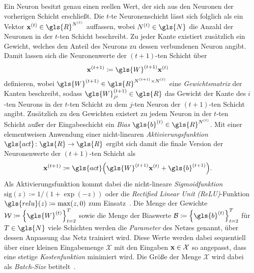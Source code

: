 Ein Neuron besitzt genau einen reellen Wert, der sich aus den Neuronen der vorherigen Schicht erschließt.
Die $t$-te Neuronenschicht lässt sich folglich als ein Vektor $\ve{x}^{\left(t\right)} \in \gls{R}^{N^{\left(t\right)}}$ auffassen, wobei $N^{\left(t\right)} \in \gls{N}$ die Anzahl der Neuronen in der $t$-ten Schicht beschreibt.
Zu jeder Kante existiert zusätzlich ein Gewicht, welches den Anteil des Neurons zu dessen verbundenen Neuron angibt.
Damit lassen sich die Neuronenwerte der $\left(t+1\right)$-ten Schicht über
\begin{equation*}
  \ve{x}^{\left(t+1\right)} \coloneqq \gls{W}^{\left(t+1\right)}\ve{x}^{\left(t\right)}
\end{equation*}
definieren, wobei $\gls{W}^{\left(t+1\right)} \in \gls{R}^{N^{\left(t+1\right)} \times N^{\left(t\right)}}$ eine \emph{Gewichtsmatrix} der Kanten beschreibt, sodass $\gls{W}^{\left(t+1\right)}_{ji} \in \gls{R}$ das Gewicht der Kante des $i$-ten Neurons in der $t$-ten Schicht zu dem $j$-ten Neuron der $\left(t+1\right)$-ten Schicht angibt.
Zusätzlich zu den Gewichten existert zu jedem Neuron in der $t$-ten Schicht außer der Eingabeschicht ein \emph{Bias} $\gls{b}^{\left(t\right)} \in \gls{R}^{N^{\left(t\right)}}$.
Mit einer elementweisen Anwendung einer nicht-linearen \emph{Aktivierungsfunktion} $\gls{act} \colon \gls{R} \to \gls{R}$ ergibt sich damit die finale Version der Neuronenwerte der $\left(t+1\right)$-ten Schicht als
\begin{equation*}
  \ve{x}^{\left(t+1\right)} \coloneqq \gls{act} \left(\gls{W}^{\left(t+1\right)}\ve{x}^{\left(t\right)} + \gls{b}^{\left(t+1\right)} \right).
\end{equation*}
Als Aktivierungsfunktion kommt dabei \bspw{} die nicht-lineare \emph{Sigmoidfunktion} $\mathrm{sig}\left(z\right) \coloneqq 1 / \left(1 + \exp\left(-z\right)\right)$ oder die \emph{Rectified Linear Unit (ReLU)}-Funktion $\gls{relu}\left(z\right) \coloneqq \max \left(z, 0\right)$ zum Einsatz~\cite{Nielsen}.
Die Menge der Gewichte $\mathcal{W} \coloneqq {\left\{\gls{W}^{\left(t\right)}\right\}}_{t=2}^T$ sowie die Menge der Biaswerte $\mathcal{B} \coloneqq {\left\{\gls{b}^{\left(t\right)}\right\}}_{t=2}^T$ für $T \in \gls{N}$ viele Schichten werden die \emph{Parameter} des Netzes genannt, über dessen Anpassung das Netz trainiert wird.
Diese Werte werden dabei sequentiell über einer kleinen Eingabemenge $\mathcal{X}$ mit den Eingaben $\mathbf{x} \in \mathcal{X}$ so angepasst, dass eine stetige \emph{Kostenfunktion} minimiert wird.
Die Größe der Menge $\mathcal{X}$ wird dabei als \emph{Batch-Size} betitelt~\cite{Nielsen}.
